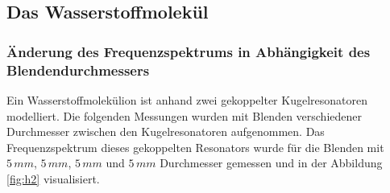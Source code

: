 \subsection{Das Wasserstoffmolekül}
\subsubsection{Änderung des Frequenzspektrums in Abhängigkeit des Blendendurchmessers}

Ein Wasserstoffmolekülion ist anhand zwei gekoppelter Kugelresonatoren modelliert. Die folgenden Messungen wurden mit Blenden verschiedener Durchmesser zwischen den Kugelresonatoren 
aufgenommen. Das Frequenzspektrum dieses gekoppelten Resonators wurde für die Blenden mit $5\,mm$, $5\,mm$, $5\,mm$ und $5\,mm$ Durchmesser gemessen und in der Abbildung \ref{fig:h2} visualisiert. \\\\

